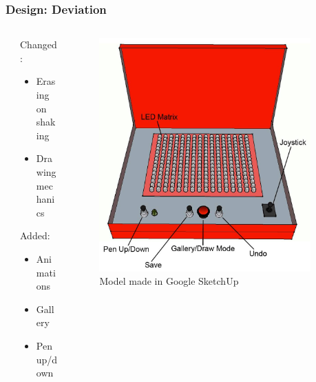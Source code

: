 \documentclass{beamer}
\begin{document}

\begin{frame}
\frametitle{Design: Deviation}

\begin{columns}

\begin{column}{0.05\textwidth}
\end{column}

\begin{column}{0.4\textwidth}
Changed:
	\begin{itemize}
	\item Erasing on shaking
	\item Drawing mechanics
	\end{itemize}
Added:
	\begin{itemize}
	\item Animations
	\item Gallery
	\item Pen up/down
	\end{itemize}
\end{column}

\begin{column}{0.5\textwidth}
\begin{figure}
	\includegraphics[scale=0.17]{images/sketchup_labels.jpg}
	\caption{Model made in Google SketchUp}
\end{figure}
\end{column}

\begin{column}{0.05\textwidth}
\end{column}

\end{columns}

\end{frame}
\end{document}
